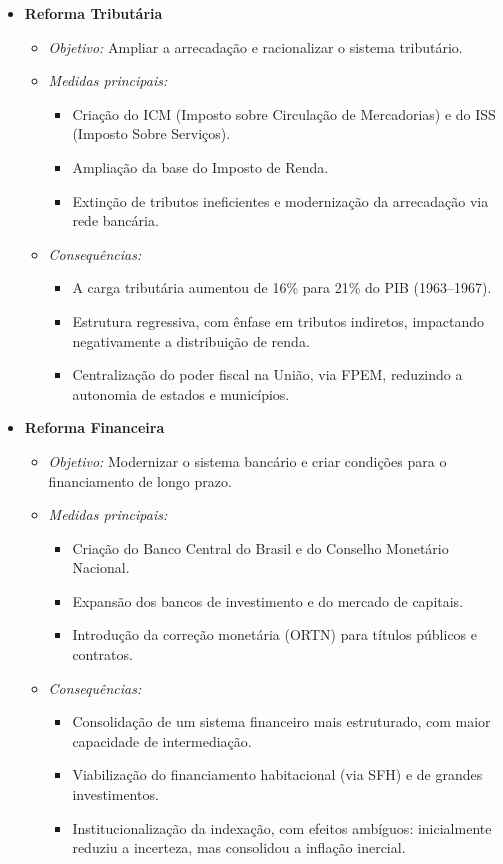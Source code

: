\documentclass{sciposter}
\begin{document}
\begin{multicols}{3}
\begin{itemize}
    \item \textbf{ Reforma Tributária}
    \begin{itemize}
        \item \textit{Objetivo:} Ampliar a arrecadação e racionalizar o sistema tributário.
        \item \textit{Medidas principais:}
        \begin{itemize}
            \item Criação do ICM (Imposto sobre Circulação de Mercadorias) e do ISS (Imposto Sobre Serviços).
            \item Ampliação da base do Imposto de Renda.
            \item Extinção de tributos ineficientes e modernização da arrecadação via rede bancária.
        \end{itemize}
        \item \textit{Consequências:}
        \begin{itemize}
            \item A carga tributária aumentou de 16\% para 21\% do PIB (1963–1967).
            \item Estrutura regressiva, com ênfase em tributos indiretos, impactando negativamente a distribuição de renda.
            \item Centralização do poder fiscal na União, via FPEM, reduzindo a autonomia de estados e municípios.
        \end{itemize}
    \end{itemize}

    \item \textbf{ Reforma Financeira}
    \begin{itemize}
        \item \textit{Objetivo:} Modernizar o sistema bancário e criar condições para o financiamento de longo prazo.
        \item \textit{Medidas principais:}
        \begin{itemize}
            \item Criação do Banco Central do Brasil e do Conselho Monetário Nacional.
            \item Expansão dos bancos de investimento e do mercado de capitais.
            \item Introdução da correção monetária (ORTN) para títulos públicos e contratos.
        \end{itemize}
        \item \textit{Consequências:}
        \begin{itemize}
            \item Consolidação de um sistema financeiro mais estruturado, com maior capacidade de intermediação.
            \item Viabilização do financiamento habitacional (via SFH) e de grandes investimentos.
            \item Institucionalização da indexação, com efeitos ambíguos: inicialmente reduziu a incerteza, mas consolidou a inflação inercial.
        \end{itemize}
    \end{itemize}


\end{itemize}
\end{multicols}
\end{document}
